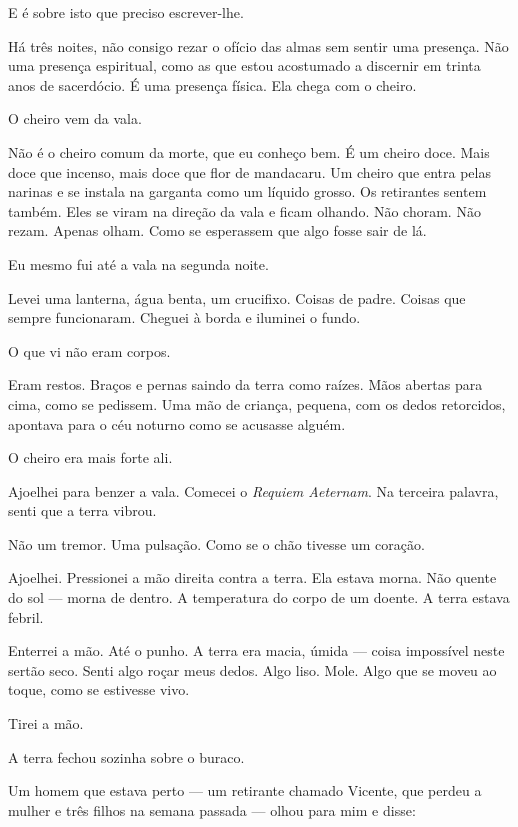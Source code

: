 \noindent E é sobre isto que preciso escrever-lhe.

\noindent Há três noites, não consigo rezar o ofício das almas sem sentir uma presença. Não uma presença espiritual, como as que estou acostumado a discernir em trinta anos de sacerdócio. É uma presença física. Ela chega com o cheiro.

\noindent O cheiro vem da vala.

\noindent Não é o cheiro comum da morte, que eu conheço bem. É um cheiro doce. Mais doce que incenso, mais doce que flor de mandacaru. Um cheiro que entra pelas narinas e se instala na garganta como um líquido grosso. Os retirantes sentem também. Eles se viram na direção da vala e ficam olhando. Não choram. Não rezam. Apenas olham. Como se esperassem que algo fosse sair de lá.

\noindent Eu mesmo fui até a vala na segunda noite.

\noindent Levei uma lanterna, água benta, um crucifixo. Coisas de padre. Coisas que sempre funcionaram. Cheguei à borda e iluminei o fundo.

\noindent O que vi não eram corpos.

\noindent Eram restos. Braços e pernas saindo da terra como raízes. Mãos abertas para cima, como se pedissem. Uma mão de criança, pequena, com os dedos retorcidos, apontava para o céu noturno como se acusasse alguém.

\noindent O cheiro era mais forte ali.

\noindent Ajoelhei para benzer a vala. Comecei o \textit{Requiem Aeternam}. Na terceira palavra, senti que a terra vibrou.

\noindent Não um tremor. Uma pulsação. Como se o chão tivesse um coração.

\noindent Ajoelhei. Pressionei a mão direita contra a terra. Ela estava morna. Não quente do sol — morna de dentro. A temperatura do corpo de um doente. A terra estava febril.

\noindent Enterrei a mão. Até o punho. A terra era macia, úmida — coisa impossível neste sertão seco. Senti algo roçar meus dedos. Algo liso. Mole. Algo que se moveu ao toque, como se estivesse vivo.

\noindent Tirei a mão.

\noindent A terra fechou sozinha sobre o buraco.

\noindent Um homem que estava perto — um retirante chamado Vicente, que perdeu a mulher e três filhos na semana passada — olhou para mim e disse:


